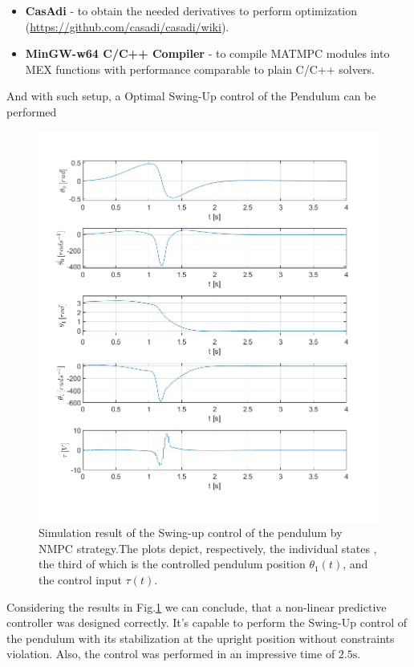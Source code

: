 \begin{itemize}
	\item \textbf{CasAdi} - to obtain the needed derivatives to perform optimization (\url{https://github.com/casadi/casadi/wiki}).
	\item \textbf{MinGW-w64 C/C++ Compiler} - to compile \textsc{MATMPC} modules into MEX functions with performance comparable to plain C/C++ solvers.
\end{itemize}
And with such setup, a Optimal Swing-Up control of the Pendulum can be performed
\newpage
\begin{figure}[H]
	\centering
	\includegraphics[width=1.1\linewidth]{images/NMPC}
	\caption{Simulation result of the Swing-up control of the pendulum by NMPC strategy.The plots depict, respectively, the individual states , the third of which is the controlled pendulum position $\theta_1(t)$, and the control input $\tau(t)$.}
	\label{NMPC:results}
\end{figure}
Considering the results in Fig.\ref{NMPC:results} we can conclude, that a non-linear predictive controller was designed correctly. It's capable to perform the Swing-Up control of the pendulum with its stabilization at the upright position without constraints violation. Also, the control was performed in an impressive time of $2.5\si{\second}$.